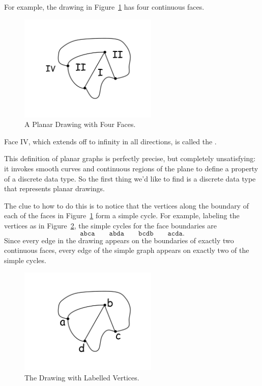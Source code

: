 For example, the drawing in Figure~\ref{fig:continuous-faces} has four
continuous faces.
\begin{figure}[h]
\centering \includegraphics[height=2in]{figures/continuous-faces}
\caption{A Planar Drawing with Four Faces.}
\label{fig:continuous-faces}
\end{figure}
Face IV, which extends off to infinity in all directions, is called the
.

This definition of planar graphs is perfectly precise, but completely
unsatisfying: it invokes smooth curves and continuous regions of the plane
to define a property of a discrete data type.  So the first thing we'd
like to find is a discrete data type that represents planar drawings.

The clue to how to do this is to notice that the vertices along the
boundary of each of the faces in Figure~\ref{fig:continuous-faces} form a
simple cycle.  For example, labeling the vertices as in
Figure~\ref{fig:continuous-cycles}, the simple cycles for the face
boundaries are
\[
\mathtt{abca}\qquad \mathtt{abda}\qquad \mathtt{bcdb}\qquad \mathtt{acda}.
\]
Since every edge in the drawing appears on the boundaries of exactly two
continuous faces, every edge of the simple graph appears on exactly two of
the simple cycles.

\begin{figure}
\centering \includegraphics[height=2in]{figures/continuous-cycles}
\caption{The Drawing with Labelled Vertices.}
\label{fig:continuous-cycles}
\end{figure}

